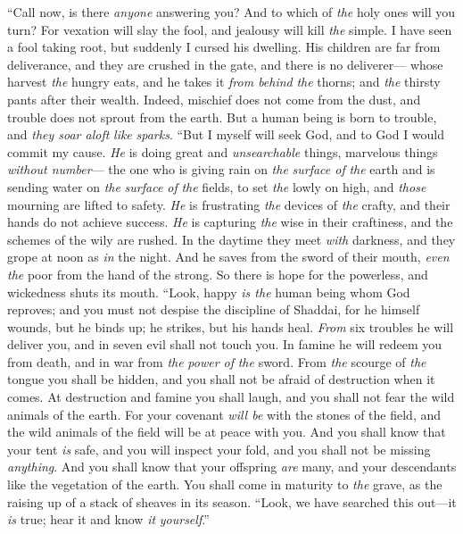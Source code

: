 \begin{biblechapter} %
 “Call now, is there \textit{anyone} answering you? 
And to which of \textit{the} holy ones will you turn?
\verse For vexation will slay the fool, 
and jealousy will kill \textit{the} simple.
\verse I have seen a fool taking root, 
but suddenly I cursed his dwelling.
\verse His children are far from deliverance, 
and they are crushed in the gate, 
and there is no deliverer—
\verse whose harvest \textit{the} hungry eats, 
and he takes it \textit{from behind} \textit{the} thorns; 
and \textit{the} thirsty pants after their wealth.
\verse Indeed, mischief does not come from the dust, 
and trouble does not sprout from the earth.
\verse But a human being is born to trouble, 
and \textit{they soar aloft} \textit{like} \textit{sparks}.
\verse “But I myself will seek God, 
and to God I would commit my cause.
\verse \textit{He} is doing great and \textit{unsearchable} things, 
marvelous things \textit{without number}—
\verse the one who is giving rain on \textit{the} \textit{surface of} \textit{the} earth 
and is sending water on \textit{the} \textit{surface of} \textit{the} fields,
\verse to set \textit{the} lowly on high, 
and \textit{those} mourning are lifted to safety.
\verse \textit{He} is frustrating \textit{the} devices of \textit{the} crafty, 
and their hands do not achieve success.
\verse \textit{He} is capturing \textit{the} wise in their craftiness, 
and the schemes of the wily are rushed.
\verse In the daytime they meet \textit{with} darkness, 
and they grope at noon as \textit{in} the night.
\verse And he saves from the sword of their mouth, 
\textit{even} \textit{the} poor from the hand of the strong.
\verse So there is hope for the powerless, 
and wickedness shuts its mouth.
\verse “Look, happy \textit{is the} human being whom God reproves; 
and you must not despise the discipline of Shaddai,
\verse for he himself wounds, but he binds up; 
he strikes, but his hands heal.
\verse \textit{From} six troubles he will deliver you, 
and in seven evil shall not touch you.
\verse In famine he will redeem you from death, 
and in war from \textit{the} \textit{power of} \textit{the} sword.
\verse From \textit{the} scourge of \textit{the} tongue you shall be hidden, 
and you shall not be afraid of destruction when it comes.
\verse At destruction and famine you shall laugh, 
and you shall not fear the wild animals of the earth.
\verse For your covenant \textit{will be} with the stones of the field, 
and the wild animals of the field will be at peace with you.
\verse And you shall know that your tent \textit{is} safe, 
and you will inspect your fold, and you shall not be missing \textit{anything}.
\verse And you shall know that your offspring \textit{are} many, 
and your descendants like the vegetation of the earth.
\verse You shall come in maturity to \textit{the} grave, 
as the raising up of a stack of sheaves in its season.
\verse “Look, we have searched this out—it \textit{is} true; 
hear it and know \textit{it} \textit{yourself}.”
\end{biblechapter}

